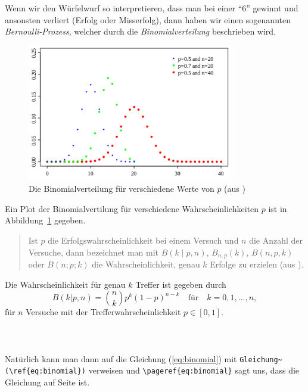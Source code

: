 \documentclass[12pt,a4paper]{scrartcl}
\begin{document}
Wenn wir den Würfelwurf so interpretieren, dass man bei einer "`6"' gewinnt
und ansonsten verliert (Erfolg oder Misserfolg), dann haben wir einen
sogenannten \textit{Bernoulli-Prozess}, welcher durch die
\textit{Binomialverteilung} \cite{wiki:binomial} beschrieben wird. 
\begin{figure}
    \centering
    \includegraphics[width=0.8\textwidth]{figures/binomial.png}
    \caption{Die Binomialverteilung für verschiedene Werte von $p$
    (aus \cite{wiki:binomial})}
    \label{fig:binomialverteilung}
\end{figure}
Ein Plot der Binomialvertilung für verschiedene Wahrscheinlichkeiten
$p$ ist in Abbildung~\ref{fig:binomialverteilung} gegeben.
\begin{quote}
    Ist $p$ die Erfolgswahrscheinlichkeit bei einem Versuch und $n$ die Anzahl der
    Versuche, dann bezeichnet man mit $B(k \mid p,n)$, $B_{n,p}(k)$, $B(n,p,k)$
    oder $B(n;p;k)$ die Wahrscheinlichkeit, genau $k$ Erfolge zu erzielen 
    (aus \cite{wiki:binomial}).
\end{quote}
Die Wahrscheinlichkeit für genau $k$ Treffer ist gegeben durch
\begin{equation}
    B(k | p,n) = \binom {n}{k} p^k (1-p)^{n-k}\quad \text{für}\quad k=0,1,\dots, n,
    \label{eq:binomial}
\end{equation}
für $n$ Versuche mit der Trefferwahrscheinlichkeit $p\in [0,1]$.\\
\\
\cprotect{}\\ \\ 
Natürlich kann man dann auf die Gleichung (\ref{eq:binomial}) mit 
\verb!Gleichung~(\ref{eq:binomial})! verweisen und \verb!\pageref{eq:binomial}! sagt
uns, dass die Gleichung auf Seite \pageref{eq:binomial} ist.
\end{document}
